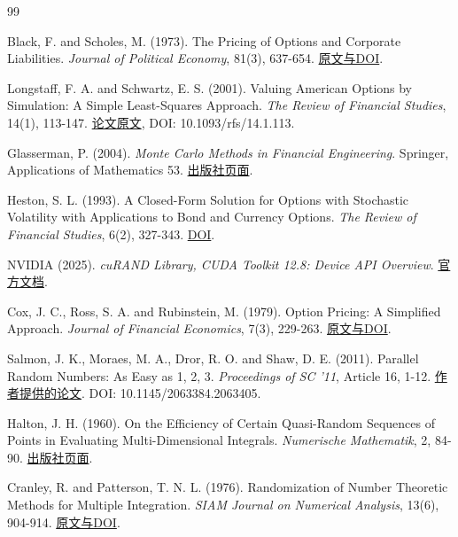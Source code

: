 \documentclass[UTF8,a4paper,zihao=5,fontset=none]{ctexart}
\begin{document}
\begingroup\small\linespread{1.0}\selectfont\begin{thebibliography}{99}\setlength{\itemsep}{1pt}\setlength{\parskip}{0pt}

Black, F. and Scholes, M. (1973). The Pricing of Options and Corporate Liabilities. \emph{Journal of Political Economy}, 81(3), 637-654. \href{https://www.journals.uchicago.edu/doi/10.1086/260062}{原文与DOI}.

Longstaff, F. A. and Schwartz, E. S. (2001). Valuing American Options by Simulation: A Simple Least-Squares Approach. \emph{The Review of Financial Studies}, 14(1), 113-147. \href{https://people.math.ethz.ch/~hjfurrer/teaching/LongstaffSchwartzAmericanOptionsLeastSquareMonteCarlo.pdf}{论文原文}, DOI: 10.1093/rfs/14.1.113.

Glasserman, P. (2004). \emph{Monte Carlo Methods in Financial Engineering}. Springer, Applications of Mathematics 53. \href{https://doi.org/10.1007/978-0-387-21617-1}{出版社页面}.

Heston, S. L. (1993). A Closed-Form Solution for Options with Stochastic Volatility with Applications to Bond and Currency Options. \emph{The Review of Financial Studies}, 6(2), 327-343. \href{https://doi.org/10.1093/rfs/6.2.327}{DOI}.

NVIDIA (2025). \emph{cuRAND Library, CUDA Toolkit 12.8: Device API Overview}. \href{https://docs.nvidia.com/cuda/archive/12.8.0/curand/device-api-overview.html}{官方文档}.

Cox, J. C., Ross, S. A. and Rubinstein, M. (1979). Option Pricing: A Simplified Approach. \emph{Journal of Financial Economics}, 7(3), 229-263. \href{https://doi.org/10.1016/0304-405X\%2879\%2990015-1}{原文与DOI}.

Salmon, J. K., Moraes, M. A., Dror, R. O. and Shaw, D. E. (2011). Parallel Random Numbers: As Easy as 1, 2, 3. \emph{Proceedings of SC '11}, Article 16, 1-12. \href{https://random123.com/papers/random123sc11.pdf}{作者提供的论文}. DOI: 10.1145/2063384.2063405.

Halton, J. H. (1960). On the Efficiency of Certain Quasi-Random Sequences of Points in Evaluating Multi-Dimensional Integrals. \emph{Numerische Mathematik}, 2, 84-90. \href{https://link.springer.com/article/10.1007/BF01386213}{出版社页面}.

Cranley, R. and Patterson, T. N. L. (1976). Randomization of Number Theoretic Methods for Multiple Integration. \emph{SIAM Journal on Numerical Analysis}, 13(6), 904-914. \href{https://epubs.siam.org/doi/10.1137/0713071}{原文与DOI}.


\end{thebibliography}
\end{document}
